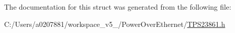 The documentation for this struct was generated from the following file\-:\begin{DoxyCompactItemize}
\item 
C\-:/\-Users/a0207881/workspace\-\_\-v5\-\_/\-Power\-Over\-Ethernet/\hyperlink{_t_p_s23861_8h}{T\-P\-S23861.\-h}\end{DoxyCompactItemize}

